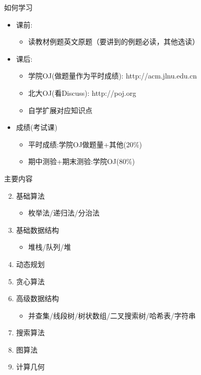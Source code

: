 \documentclass{beamer}
\begin{document}
\begin{frame}{如何学习}
    \begin{itemize}
        \item 课前:
        \begin{itemize}
            \item 读教材例题英文原题（要讲到的例题必读，其他选读）
        \end{itemize}
        \item 课后:
        \begin{itemize}
            \item 学院OJ(做题量作为平时成绩): http://acm.jlnu.edu.cn
            \item 北大OJ(看Discuss): http://poj.org
            \item 自学扩展对应知识点
        \end{itemize}
        \item 成绩(\alert{考试课})
        \begin{itemize}
            \item 平时成绩:学院OJ做题量+其他(20\%)
            \item 期中测验+期末测验:学院OJ(80\%)
        \end{itemize}
    \end{itemize}
\end{frame}
\begin{frame}{主要内容}
    \begin{enumerate}
    \setcounter{enumi}{1}
        \item 基础算法
        \begin{itemize}
            \item 枚举法/递归法/分治法
        \end{itemize}
        \item 基础数据结构
        \begin{itemize}
            \item 堆栈/队列/堆
        \end{itemize}
        \item 动态规划
        \item 贪心算法
        \item 高级数据结构
        \begin{itemize}
            \item 并查集/线段树/树状数组/二叉搜索树/哈希表/字符串
        \end{itemize}
        \item 搜索算法
        \item 图算法
        \item 计算几何
    \end{enumerate}
\end{frame}
\end{document}
